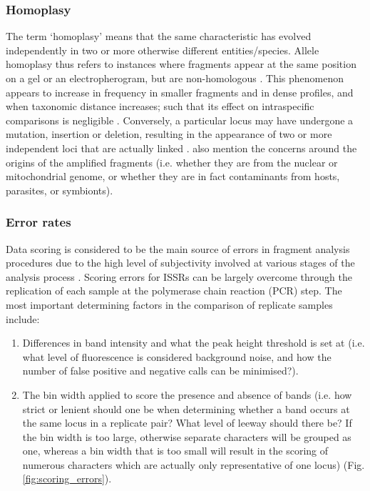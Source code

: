 \subsubsection{Homoplasy}
The term `homoplasy' means that the same characteristic has evolved independently in two or more otherwise different entities/species. Allele homoplasy thus refers to instances where fragments appear at the same position on a gel or an electropherogram, but are non-homologous \citep{bonin2007statistical, simmons2007penalty}. This phenomenon appears to increase in frequency in smaller fragments and in dense profiles, and when taxonomic distance increases; such that its effect on intraspecific comparisons is negligible \citep{bonin2007statistical}. Conversely, a particular locus may have undergone a mutation, insertion or deletion, resulting in the appearance of two or more independent loci that are actually linked \citep{simmons2007penalty}. \citet{simmons2007penalty} also mention the concerns around the origins of the amplified fragments (i.e. whether they are from the nuclear or mitochondrial genome, or whether they are in fact contaminants from hosts, parasites, or symbionts). 

\subsubsection{Error rates}
Data scoring is considered to be the main source of errors in fragment analysis procedures due to the high level of subjectivity involved at various stages of the analysis process \citep{bonin2004track}. Scoring errors for ISSRs can be largely overcome through the replication of each sample at the polymerase chain reaction (PCR) step. The most important determining factors in the comparison of replicate samples include:
\vspace{0.4cm}
\begin{enumerate}
    \item Differences in band intensity and what the peak height threshold is set at (i.e. what level of fluorescence is considered background noise, and how the number of false positive and negative calls can be minimised?).
    \item The bin width applied to score the presence and absence of bands (i.e. how strict or lenient should one be when determining whether a band occurs at the same locus in a replicate pair? What level of leeway should there be? If the bin width is too large, otherwise separate characters will be grouped as one, whereas a bin width that is too small will result in the scoring of numerous characters which are actually only representative of one locus) (Fig. \ref{fig:scoring_errors}). 
\end{enumerate}
\vspace{0.4cm}

